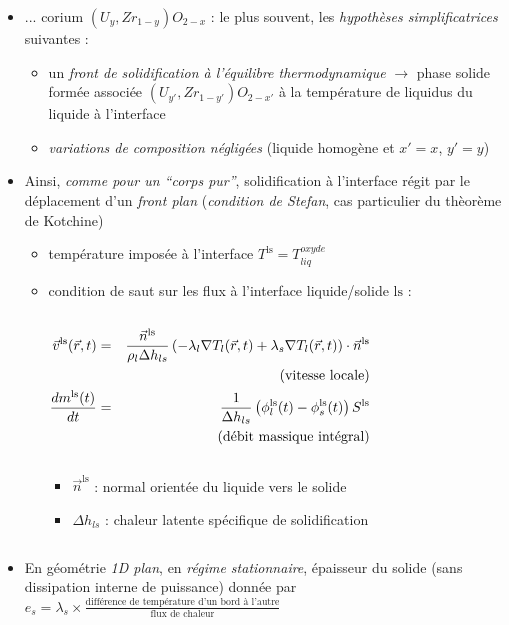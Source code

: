 \begin{frame}[fragile]
\begin{itemize}
\item ... corium $\left(U_y,Zr_{1-y}\right)O_{2-x}$ : le plus souvent, les \emph{hypothèses simplificatrices} suivantes :
\begin{itemize}
  \item un \emph{front de solidification à l'équilibre thermodynamique} $\rightarrow$ phase solide formée associée $\left(U_{y'},Zr_{1-y'}\right)O_{2-x'}$ à la température de liquidus du liquide à l'interface 
  \item \emph{variations de composition négligées} (liquide homogène et $x'=x$, $y'=y$)
\end{itemize}
\item Ainsi, \emph{comme pour un ``corps pur''}, solidification à l'interface régit par le déplacement d'un \emph{front plan} (\emph{condition de Stefan}, cas particulier du thèorème de Kotchine)
\begin{itemize}
  \item température imposée à l'interface $T^{\textrm{ls}}=T_{liq}^{oxyde}$
  \item condition de saut sur les flux à l'interface liquide/solide $\textrm{ls}$ : 
\begin{columns}
\begin{scriptsize}
\begin{column}{0.55\textwidth}
\begin{eqnarray*}
  \vec{v}^{\textrm{ls}}(\vec{r}, t) &=& \frac{\vec{n}^{\textrm{ls}}}{\rho_l \Delta h_{ls}} \left(-\lambda_l \nabla T_l(\vec{r}, t) + \lambda_s \nabla T_l(\vec{r}, t) \right) \cdot \vec{n}^{\textrm{ls}} \\
  &&\text{(vitesse locale)}\\
  \frac{dm^{\textrm{ls}}(t)}{dt} &=& \frac{1}{\Delta h_{ls}} \left(\phi_l^{\textrm{ls}}(t) - \phi_s^{\textrm{ls}}(t)\right) S^{\textrm{ls}} \\
  && \text{(débit massique intégral)}
\end{eqnarray*}
\end{column}
\begin{column}{0.45\textwidth}
\begin{itemize}
\item $\vec{n}^{\textrm{ls}}$ : normal orientée du liquide vers le solide
\item $\Delta h_{ls}$ : chaleur latente spécifique de solidification
\end{itemize}
\end{column}
\end{scriptsize}
\end{columns}
\end{itemize}
\item En géométrie \emph{1D plan}, en  \emph{régime stationnaire}, épaisseur du solide (sans dissipation interne de puissance) donnée par \emph{$e_{s} = \lambda_{s}\times \frac{\text{différence de température d'un bord à l'autre}}{\text{flux de chaleur}}$}
\end{itemize}
\end{frame}
